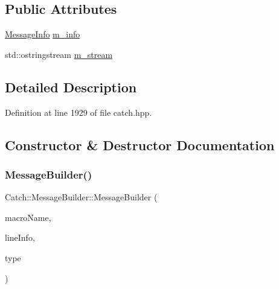 \subsection*{Public Attributes}
\begin{DoxyCompactItemize}
\item 
\hyperlink{struct_catch_1_1_message_info}{Message\+Info} \hyperlink{struct_catch_1_1_message_builder_a979f1c2b36d78f80ee275bfa5ba0209f}{m\+\_\+info}
\item 
std\+::ostringstream \hyperlink{struct_catch_1_1_message_builder_a6488ab0cc4ea52affc9c0612c7c5df6b}{m\+\_\+stream}
\end{DoxyCompactItemize}


\subsection{Detailed Description}


Definition at line 1929 of file catch.\+hpp.



\subsection{Constructor \& Destructor Documentation}
\hypertarget{struct_catch_1_1_message_builder_ab0c6378e722680bf58852c6ee2b6e724}{}\label{struct_catch_1_1_message_builder_ab0c6378e722680bf58852c6ee2b6e724} 
\subsubsection{\texorpdfstring{Message\+Builder()}{MessageBuilder()}}
{\footnotesize\ttfamily Catch\+::\+Message\+Builder\+::\+Message\+Builder (\begin{DoxyParamCaption}\item[{std\+::string const \&}]{macro\+Name,  }\item[{\hyperlink{struct_catch_1_1_source_line_info}{Source\+Line\+Info} const \&}]{line\+Info,  }\item[{\hyperlink{struct_catch_1_1_result_was_a624e1ee3661fcf6094ceef1f654601ef}{Result\+Was\+::\+Of\+Type}}]{type }\end{DoxyParamCaption})\hspace{0.3cm}{\ttfamily [inline]}}



